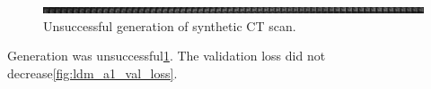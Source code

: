 \begin{figure}[H]
\includegraphics[width=\linewidth]{detailed_engineering/Monai Diffusion - Attempt 1/charts/generation.png}
\caption{Unsuccessful generation of synthetic CT scan.}
\label{fig:attempt1-generation}
\end{figure}

Generation was unsuccessful\ref{fig:attempt1-generation}. The validation loss did not decrease\ref{fig:ldm_a1_val_loss}.
